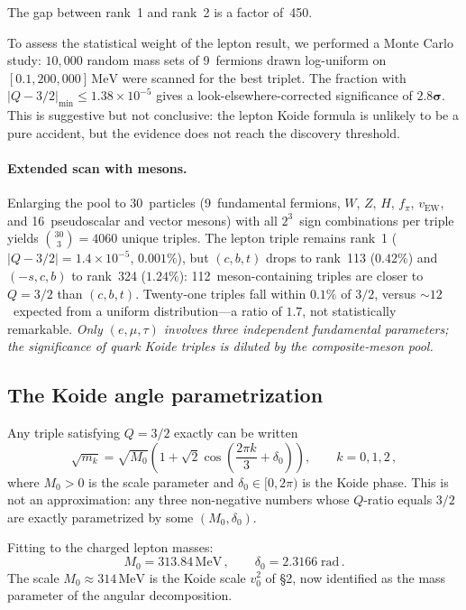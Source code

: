 \documentclass[12pt,a4paper]{article}
\newcommand{\MeV}{\,\text{MeV}}
\newcommand{\fpi}{f_\pi}
\begin{document}
The gap between rank~1 and rank~2 is a factor of~450.

To assess the statistical weight of the lepton result, we performed a
Monte Carlo study: $10{,}000$ random mass sets of 9~fermions drawn
log-uniform on $[0.1, 200{,}000]\MeV$ were scanned for the best
triplet. The fraction with $|Q - 3/2|_{\min} \leq 1.38 \times 10^{-5}$
gives a look-elsewhere-corrected significance of $\mathbf{2.8\sigma}$.
This is suggestive but not conclusive: the lepton Koide formula is
unlikely to be a pure accident, but the evidence does not reach the
discovery threshold.

\paragraph{Extended scan with mesons.}
Enlarging the pool to 30~particles (9~fundamental fermions, $W$, $Z$,
$H$, $\fpi$, $v_{\text{EW}}$, and 16~pseudoscalar and vector mesons)
with all $2^3$~sign combinations per triple yields $\binom{30}{3} = 4060$
unique triples.  The lepton triple remains rank~1
($|Q-3/2| = 1.4\times 10^{-5}$, $0.001\%$), but $(c,b,t)$ drops to
rank~113 ($0.42\%$) and $(-s,c,b)$ to rank~324 ($1.24\%$): 112~meson-containing
triples are closer to $Q = 3/2$ than $(c,b,t)$.  Twenty-one triples
fall within $0.1\%$ of $3/2$, versus $\sim 12$~expected from a uniform
distribution---a ratio of $1.7$, not statistically remarkable.
\emph{Only $(e,\mu,\tau)$ involves three independent fundamental
parameters; the significance of quark Koide triples is diluted by the
composite-meson pool.}

\subsection{The Koide angle parametrization}
Any triple satisfying $Q = 3/2$ exactly can be written~\cite{Koide1983}
\begin{equation}
\sqrt{m_k} = \sqrt{M_0}\left(1 + \sqrt{2}\cos\!\left(
\frac{2\pi k}{3} + \delta_0\right)\right), \qquad k = 0,1,2\,,
\end{equation}
where $M_0 > 0$ is the scale parameter and $\delta_0 \in [0, 2\pi)$
is the Koide phase. This is not an approximation: any three
non-negative numbers whose $Q$-ratio equals $3/2$ are exactly
parametrized by some $(M_0, \delta_0)$.

Fitting to the charged lepton masses:
\begin{equation}
M_0 = 313.84\MeV\,, \qquad \delta_0 = 2.3166\;\text{rad}\,.
\end{equation}
The scale $M_0 \approx 314\MeV$ is the Koide scale $v_0^2$ of
\S2, now identified as the mass parameter of the
angular decomposition.
\end{document}
